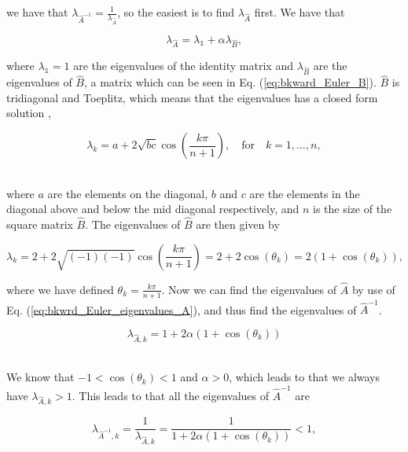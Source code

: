 \documentclass[12pt]{article}
\begin{document}
\begin{flushleft}
we have that $\lambda_{\hat{A}^{-1}} = \frac{1}{\lambda_{\hat{A}}}$, so the easiest is to find $\lambda_{\hat{A}}$ first. We have that

\vspace{5mm}
\begin{equation}\label{eq:bkwrd_Euler_eigenvalues_A}
\lambda_{\hat{A}} = \lambda_{\mathbb{1}} + \alpha\lambda_{\hat{B}},
\end{equation}
\vspace{5mm}

where $\lambda_{\mathbb{1}} = 1$ are the eigenvalues of the identity matrix and $\lambda_{\hat{B}}$ are the eigenvalues of $\hat{B}$, a matrix which can be seen in Eq. (\ref{eq:bkward_Euler_B}). $\hat{B}$ is tridiagonal and Toeplitz, which means that the eigenvalues has a closed form solution \cite{tridiag_matrix}, \cite{toeplitz_matrix}

\vspace{5mm}
$$\lambda_k = a + 2\sqrt{bc}\cos\left(\frac{k\pi}{n+1}\right),\quad \text{for}\quad k=1,\dots ,n,$$\\
\vspace{5mm}  

where $a$ are the elements on the diagonal, $b$ and $c$ are the elements in the diagonal above and below the mid diagonal respectively, and $n$ is the size of the square matrix $\hat{B}$. The eigenvalues of $\hat{B}$ are then given by

\vspace{5mm}
\begin{equation}\label{eq:eigenvalues_toeplitz}
\lambda_k = 2 +2\sqrt{(-1)(-1)}\cos\left(\frac{k\pi}{n+1}\right) = 2+2\cos(\theta_k) = 2(1+\cos(\theta_k)),
\end{equation}
\vspace{5mm}

where we have defined $\theta_k = \frac{k\pi}{n+1}$. Now we can find the eigenvalues of $\hat{A}$ by use of Eq. (\ref{eq:bkwrd_Euler_eigenvalues_A}), and thus find the eigenvalues of $\hat{A}^{-1}$.

\vspace{5mm}
$$\lambda_{\hat{A},k} = 1+2\alpha(1+\cos(\theta_k))$$\\
\vspace{5mm}

We know that $-1 < \cos(\theta_k) < 1$ and
$\alpha > 0$, which leads to that we always have $\lambda_{\hat{A},k}>1$. This leads to that all the eigenvalues of $\hat{A}^{-1}$ are

\vspace{5mm}
$$\lambda_{\hat{A}^{-1},k} = \frac{1}{\lambda_{\hat{A},k}} = \frac{1}{1+2\alpha(1+\cos(\theta_k))}< 1,$$\\
\vspace{5mm}


\end{flushleft}
\end{document}

